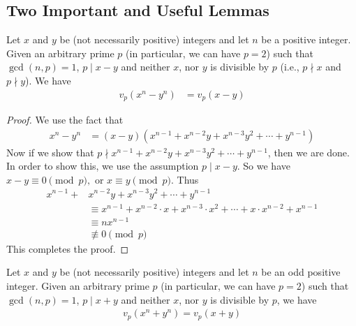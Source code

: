 \subsection{Two Important and Useful Lemmas}

    \begin{lemma}\label{lem:lte-firstlemma}
         Let $x$ and $y$ be (not necessarily positive) integers and let $n$ be a positive integer. Given an arbitrary prime $p$ (in particular, we can have $p=2$) such that $ \gcd(n,p) = 1$, $p \mid  x - y$ and neither $x$, nor $y$ is divisible by $p$ (i.e., $p \nmid x$ and $p \nmid y$).  We have
           \begin{align*}
	            v_p\left(  x^n - y^n \right)
	            	& = v_p(  x - y )
           \end{align*}
    \end{lemma}

    \begin{proof}
        We use the fact that
	        \begin{align*}
	      	  x^n - y^n
	      	  	& = (x - y)\left(x^{n - 1} + x^{n - 2}y + x^{n - 3}y^2 + \cdots + y^{n - 1}\right)
	        \end{align*}
        Now if we show that $p \nmid x^{n - 1} + x^{n - 2}y + x^{n - 3}y^2 + \cdots + y^{n - 1}$, then we are done.
        In order to show this, we use the assumption $p \mid x-y.$  So we have $x-y \equiv 0 \pmod p,$
        or $x \equiv y \pmod p.$  Thus
        \begin{align*}
        x^{n - 1} + & x^{n - 2}y + x^{n - 3}y^2 + \cdots + y^{n - 1} \\
        & \equiv x^{n-1} +x^{n-2}  \cdot x +x^{n - 3} \cdot x^2 +\cdots +x \cdot x^{n-2} + x^{n-1} \\
        & \equiv n x^{n-1} \\
        & \not\equiv 0 \pmod p
        \end{align*}
        This completes the proof.
       \end{proof}


    \begin{lemma}\label{secondlemma}
        Let $ x$ and $y$ be (not necessarily positive) integers and let $n$ be an odd positive integer. Given an arbitrary prime $p$ (in particular, we can have $p=2$) such that $ \gcd(n,p) = 1$, $p\mid x + y$ and neither $x$, nor $y$ is divisible by $p$, we have
        \begin{align*}
	        v_p\left(  x^n + y^n \right) = v_p ( x + y )
        \end{align*}
    \end{lemma}


